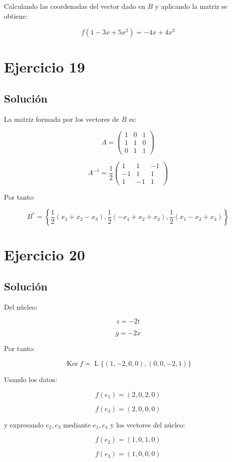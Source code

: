 \documentclass[11pt,a4paper]{article}
\newcommand{\Ker}{\operatorname{Ker}}
\newcommand{\Span}{\operatorname{L}}
\begin{document}
	Calculando las coordenadas del vector dado en $B$ y aplicando la matriz se obtiene:

	\[
	\boxed{
	f(1-3x+5x^2)
	=
	-4x+4x^2
	}
	\]

\section{Ejercicio 19}
	\subsection{Solución}

	La matriz formada por los vectores de $B$ es:

	\[
	A=
	\begin{pmatrix}
	1&0&1\\
	1&1&0\\
	0&1&1
	\end{pmatrix}
	\]

	\[
	A^{-1}
	=
	\frac12
	\begin{pmatrix}
	1&1&-1\\
	-1&1&1\\
	1&-1&1
	\end{pmatrix}
	\]

	Por tanto:

	\[
	\boxed{
	B^*
	=
	\left\{
	\frac12(x_1+x_2-x_3),
	\frac12(-x_1+x_2+x_3),
	\frac12(x_1-x_2+x_3)
	\right\}
	}
	\]

\section{Ejercicio 20}
	\subsection{Solución}

	Del núcleo:

	\[
	z=-2t
	\]

	\[
	y=-2x
	\]

	Por tanto:

	\[
	\Ker f
	=
	\Span\{(1,-2,0,0),(0,0,-2,1)\}
	\]

	Usando los datos:

	\[
	f(e_1)=(2,0,2,0)
	\]

	\[
	f(e_4)=(2,0,0,0)
	\]

	y expresando $e_2,e_3$ mediante $e_1,e_4$ y los vectores del núcleo:

	\[
	f(e_2)=(1,0,1,0)
	\]

	\[
	f(e_3)=(1,0,0,0)
	\]
\end{document}
